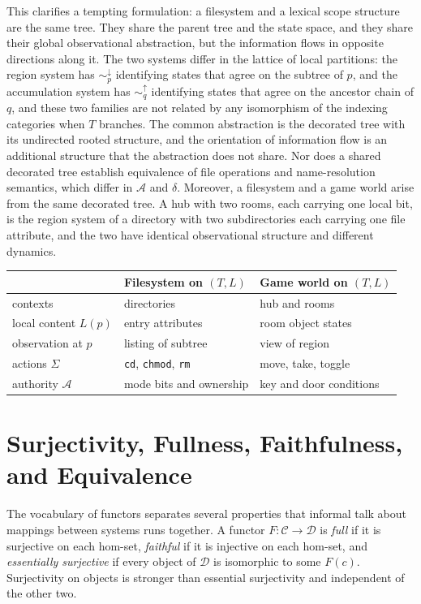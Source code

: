 \documentclass[11pt]{article}
\theoremstyle{definition}
\theoremstyle{remark}
\newcommand{\cC}{\mathcal C}
\newcommand{\cD}{\mathcal D}
\newcommand{\cA}{\mathcal A}
\newcommand{\sk}{\sim}
\begin{document}
This clarifies a tempting formulation: a filesystem and a lexical scope structure are the same tree. They share the parent tree and the state space, and they share their global observational abstraction, but the information flows in opposite directions along it. The two systems differ in the lattice of local partitions: the region system has $\sk^{\downarrow}_p$ identifying states that agree on the subtree of $p$, and the accumulation system has $\sk^{\uparrow}_q$ identifying states that agree on the ancestor chain of $q$, and these two families are not related by any isomorphism of the indexing categories when $T$ branches. The common abstraction is the decorated tree with its undirected rooted structure, and the orientation of information flow is an additional structure that the abstraction does not share. Nor does a shared decorated tree establish equivalence of file operations and name-resolution semantics, which differ in $\cA$ and $\delta$. Moreover, a filesystem and a game world arise from the same decorated tree. A hub with two rooms, each carrying one local bit, is the region system of a directory with two subdirectories each carrying one file attribute, and the two have identical observational structure and different dynamics.

\begin{center}
\begin{tabular}{lll}
\toprule
 & Filesystem on $(T,L)$ & Game world on $(T,L)$\\
\midrule
contexts & directories & hub and rooms\\
local content $L(p)$ & entry attributes & room object states\\
observation at $p$ & listing of subtree & view of region\\
actions $\Sigma$ & \texttt{cd}, \texttt{chmod}, \texttt{rm} & move, take, toggle\\
authority $\cA$ & mode bits and ownership & key and door conditions\\
\bottomrule
\end{tabular}
\end{center}

\section{Surjectivity, Fullness, Faithfulness, and Equivalence}

The vocabulary of functors separates several properties that informal talk about mappings between systems runs together. A functor $F:\cC\to\cD$ is \emph{full} if it is surjective on each hom-set, \emph{faithful} if it is injective on each hom-set, and \emph{essentially surjective} if every object of $\cD$ is isomorphic to some $F(c)$. Surjectivity on objects is stronger than essential surjectivity and independent of the other two.
\end{document}

